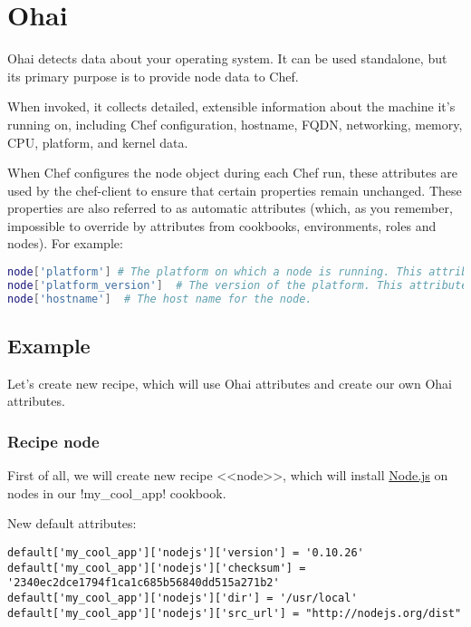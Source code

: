\section{Ohai}
\label{sec:cookbook-ohai}

Ohai detects data about your operating system. It can be used standalone, but its primary purpose is to provide node data to Chef.

When invoked, it collects detailed, extensible information about the machine it's running on, including Chef configuration, hostname, FQDN, networking, memory, CPU, platform, and kernel data.

When Chef configures the node object during each Chef run, these attributes are used by the chef-client to ensure that certain properties remain unchanged. These properties are also referred to as automatic attributes (which, as you remember, impossible to override by attributes from cookbooks, environments, roles and nodes). For example:

\begin{lstlisting}[language=Bash,label=lst:cookbook-ohai1]
node['platform'] # The platform on which a node is running. This attribute helps determine which providers will be used.
node['platform_version']  # The version of the platform. This attribute helps determine which providers will be used.
node['hostname']  # The host name for the node.
\end{lstlisting}

\subsection{Example}

Let's create new recipe, which will use Ohai attributes and create our own Ohai attributes.

\subsubsection{Recipe node}

First of all, we will create new recipe <<node>>, which will install \href{http://nodejs.org/}{Node.js} on nodes in our \inline!my_cool_app! cookbook.

New default attributes:

\begin{lstlisting}[label=lst:cookbook-ohai-attributes,title=my-server-cloud/site-cookbooks/my\_cool\_app/attributes/node.rb]
default['my_cool_app']['nodejs']['version'] = '0.10.26'
default['my_cool_app']['nodejs']['checksum'] = '2340ec2dce1794f1ca1c685b56840dd515a271b2'
default['my_cool_app']['nodejs']['dir'] = '/usr/local'
default['my_cool_app']['nodejs']['src_url'] = "http://nodejs.org/dist"
\end{lstlisting}

